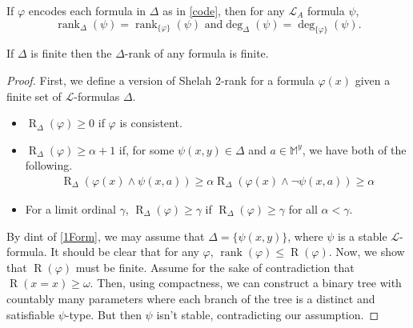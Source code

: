 \documentclass{article}
\newcommand\monster{\mathbb{M}}
\DeclareMathOperator{\rank}{rank}
\DeclareMathOperator{\twoR}{R}
\let\mc\mathcal
\begin{document}
\begin{corollary}\label{1Form}
    If $\varphi$ encodes each formula in $\Delta$ as in \autoref{code}, then for any $\mc{L}_A$ formula $\psi$,
    \[ \rank_{\Delta}(\psi) = \rank_{\{ \varphi \}}(\psi) \text{ and} \deg_{\Delta}(\psi) = \deg_{\{ \varphi \}}(\psi). \]
\end{corollary}

\begin{lemma}
    If $\Delta$ is finite then the $\Delta$-rank of any formula is finite.
\end{lemma}
\begin{proof}
    First, we define a version of Shelah 2-rank for a formula $\varphi(x)$ given a finite set of $\mc{L}$-formulas $\Delta$. 
    \begin{itemize}
        \item $\twoR_{\Delta}(\varphi) \geq 0$ if $\varphi$ is consistent.
        \item $\twoR_{\Delta}(\varphi) \geq \alpha + 1$ if, for some $\psi(x,y) \in \Delta$ and $a \in \monster^{y}$, we have both of the following.
        \begin{align*} 
            \twoR_{\Delta}(\varphi(x) \land \psi(x, a)) \geq \alpha
            \twoR_{\Delta}(\varphi(x) \land \neg \psi(x, a)) \geq \alpha
        \end{align*}
        \item For a limit ordinal $\gamma$, $\twoR_{\Delta}(\varphi) \geq \gamma$ if $\twoR_{\Delta}(\varphi) \geq \gamma$ for all $\alpha < \gamma$.
    \end{itemize}
    By dint of \autoref{1Form}, we may assume that $\Delta = \{ \psi(x, y) \}$, where $\psi$ is a stable $\mc{L}$-formula. It should be clear that for any $\varphi$, $\rank(\varphi) \leq \twoR(\varphi)$. Now, we show that $\twoR(\varphi)$ must be finite. Assume for the sake of contradiction that $\twoR(x = x) \geq \omega$. Then, using compactness, we can construct a binary tree with countably many parameters where each branch of the tree is a distinct and satisfiable $\psi$-type. But then $\psi$ isn't stable, contradicting our assumption.
\end{proof}
\end{document}
